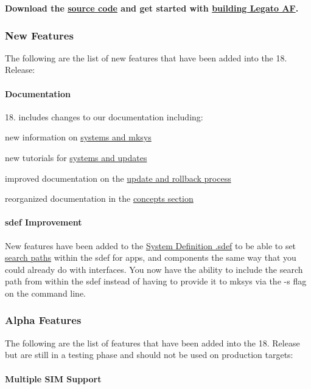 {\bfseries  Download the \hyperlink{aboutReleaseInfo}{source code} and get started with \hyperlink{basicBuild}{building Legato AF}. }\hypertarget{releaseNotes18040_rn1804_Features}{}\subsubsection{New Features}\label{releaseNotes18040_rn1804_Features}
The following are the list of new features that have been added into the 18. Release\+:\hypertarget{releaseNotes18040_rn1804_Features_Documentation}{}\paragraph{Documentation}\label{releaseNotes18040_rn1804_Features_Documentation}
18. includes changes to our documentation including\+:
\begin{DoxyItemize}
\item new information on \hyperlink{conceptsEnvironment}{systems and mksys}
\item new tutorials for \hyperlink{getStartedApps}{systems and updates}
\item improved documentation on the \hyperlink{conceptsUpdates}{update and rollback process}
\item reorganized documentation in the \hyperlink{concepts}{concepts section}
\end{DoxyItemize}\hypertarget{releaseNotes18040_rn1804_Features_sdef}{}\paragraph{sdef Improvement}\label{releaseNotes18040_rn1804_Features_sdef}
New features have been added to the \hyperlink{defFilesSdef}{System Definition .sdef} to be able to set \hyperlink{defFilesSdef_defFilesSdef_searchPaths}{search paths} within the sdef for apps, and components the same way that you could already do with interfaces. You now have the ability to include the search path from within the sdef instead of having to provide it to {\ttfamily mksys} via the {\ttfamily -\/s} flag on the command line.\hypertarget{releaseNotes18040_rn1804_AFeatures}{}\subsubsection{Alpha Features}\label{releaseNotes18040_rn1804_AFeatures}
The following are the list of features that have been added into the 18. Release but are still in a testing phase and should not be used on production targets\+:\hypertarget{releaseNotes18040_rn1804_AFeatures_SIM}{}\paragraph{Multiple S\+I\+M Support}\label{releaseNotes18040_rn1804_AFeatures_SIM}
